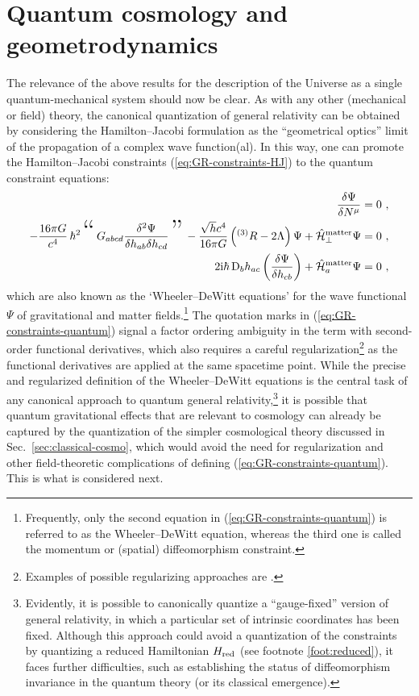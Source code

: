 \documentclass[12pt]{iopart}
\def\eq#1{\begin{equation}\begin{aligned}#1\end{aligned}\end{equation}}
\def\eref#1{(\ref{eq:#1})}
\def\I{\mathrm{i}}
\begin{document}
\section{\label{sec:quantum-geomd}Quantum cosmology and geometrodynamics}
The relevance of the above results for the description of the Universe as a single quantum-mechanical system should now be clear. As with any other (mechanical or field) theory, the canonical quantization of general relativity can be obtained by considering the Hamilton--Jacobi formulation as the ``geometrical optics'' limit of the propagation of a complex wave function(al). In this way, one can promote the Hamilton--Jacobi constraints \eref{GR-constraints-HJ} to the quantum constraint equations:
\eq{\label{eq:GR-constraints-quantum}
\frac{\delta \Psi}{\delta N^{\mu}} &=0 \ , \\
-\frac{16\pi G}{c^4} \,\hbar^2\,\text{\Huge``}\,G_{abcd}\frac{\delta^2 \Psi}{\delta h_{ab}\delta h_{cd}}\,\text{\Huge''}\,-\frac{\sqrt{h}c^4}{16\pi G}\left(^{(3)}R-2\Lambda\right)\Psi+\hat{\mathcal{H}}_{\perp}^{\rm matter}\Psi &= 0\ , \\
2\I\hbar\,\mathrm{D}_b h_{ac}\left(\frac{\delta \Psi}{\delta h_{cb}}\right)+\hat{\mathcal{H}}_{a}^{\rm matter}\Psi &= 0 \ ,
}
which are also known as the `Wheeler--DeWitt equations' \citep{Kiefer:book} for the wave functional $\Psi$ of gravitational and matter fields.\footnote{Frequently, only the second equation in \eref{GR-constraints-quantum} is referred to as the Wheeler--DeWitt equation, whereas the third one is called the momentum or (spatial) diffeomorphism constraint.} The quotation marks in \eref{GR-constraints-quantum} signal a factor ordering ambiguity in the term with second-order functional derivatives, which also requires a careful regularization\footnote{Examples of possible regularizing approaches are \citet{Williams:1996jb,Ambjorn:1998xu,Hamber:2011cn,Liu:2015bwa,Feng:2018cul,Ambjorn:2022naa,Lang:2023lad,Lang:2023ugj}.} as the functional derivatives are applied at the same spacetime point. While the precise and regularized definition of the Wheeler--DeWitt equations is the central task of any canonical approach to quantum general relativity,\footnote{Evidently, it is possible to canonically quantize a ``gauge-fixed'' version of general relativity, in which a particular set of intrinsic coordinates has been fixed. Although this approach could avoid a quantization of the constraints by quantizing a reduced Hamiltonian $H_{\rm red}$ (see footnote \ref{foot:reduced}), it faces further difficulties, such as establishing the status of diffeomorphism invariance in the quantum theory (or its classical emergence).} it is possible that quantum gravitational effects that are relevant to cosmology can already be captured by the quantization of the simpler cosmological theory discussed in Sec.~\ref{sec:classical-cosmo}, which would avoid the need for regularization and other field-theoretic complications of defining \eref{GR-constraints-quantum}. This is what is considered next.
\end{document}
